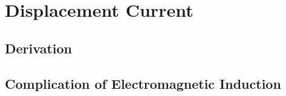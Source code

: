 \documentclass[class=article, crop=false, 12pt]{standalone}
\begin{document}
\linesep
\section{Displacement Current}

\subsection{Derivation}



\subsection{Complication of Electromagnetic Induction}




\theend
\end{document}

